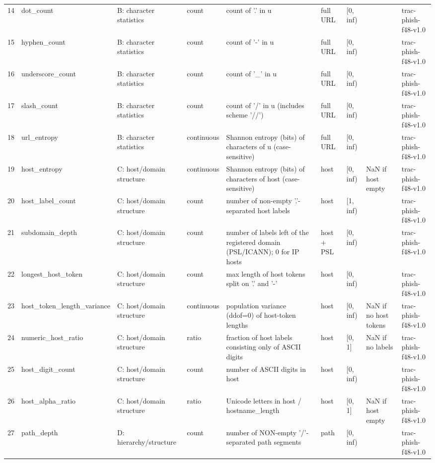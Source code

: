 \begin{tabular}{rllllllll}
14 & dot\_count & B: character statistics & count & count of '.' in u & full URL & [0, inf) &  & trac-phish-f48-v1.0 \\
15 & hyphen\_count & B: character statistics & count & count of '-' in u & full URL & [0, inf) &  & trac-phish-f48-v1.0 \\
16 & underscore\_count & B: character statistics & count & count of '\_' in u & full URL & [0, inf) &  & trac-phish-f48-v1.0 \\
17 & slash\_count & B: character statistics & count & count of '/' in u (includes scheme '//') & full URL & [0, inf) &  & trac-phish-f48-v1.0 \\
18 & url\_entropy & B: character statistics & continuous & Shannon entropy (bits) of characters of u (case-sensitive) & full URL & [0, inf) &  & trac-phish-f48-v1.0 \\
19 & host\_entropy & C: host/domain structure & continuous & Shannon entropy (bits) of characters of host (case-sensitive) & host & [0, inf) & NaN if host empty & trac-phish-f48-v1.0 \\
20 & host\_label\_count & C: host/domain structure & count & number of non-empty '.'-separated host labels & host & [1, inf) &  & trac-phish-f48-v1.0 \\
21 & subdomain\_depth & C: host/domain structure & count & number of labels left of the registered domain (PSL/ICANN); 0 for IP hosts & host + PSL & [0, inf) &  & trac-phish-f48-v1.0 \\
22 & longest\_host\_token & C: host/domain structure & count & max length of host tokens split on '.' and '-' & host & [0, inf) &  & trac-phish-f48-v1.0 \\
23 & host\_token\_length\_variance & C: host/domain structure & continuous & population variance (ddof=0) of host-token lengths & host & [0, inf) & NaN if no host tokens & trac-phish-f48-v1.0 \\
24 & numeric\_host\_ratio & C: host/domain structure & ratio & fraction of host labels consisting only of ASCII digits & host & [0, 1] & NaN if no labels & trac-phish-f48-v1.0 \\
25 & host\_digit\_count & C: host/domain structure & count & number of ASCII digits in host & host & [0, inf) &  & trac-phish-f48-v1.0 \\
26 & host\_alpha\_ratio & C: host/domain structure & ratio & Unicode letters in host / hostname\_length & host & [0, 1] & NaN if host empty & trac-phish-f48-v1.0 \\
27 & path\_depth & D: hierarchy/structure & count & number of NON-empty '/'-separated path segments & path & [0, inf) &  & trac-phish-f48-v1.0 \\

\end{tabular}
